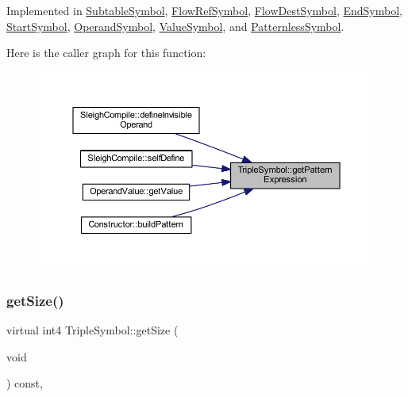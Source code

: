 Implemented in \mbox{\hyperlink{class_subtable_symbol_a103ecc93b2b3fe1a5db3edef893a4d5b}{Subtable\+Symbol}}, \mbox{\hyperlink{class_flow_ref_symbol_a273808a2774690c6c194961c956e3330}{Flow\+Ref\+Symbol}}, \mbox{\hyperlink{class_flow_dest_symbol_ad213382efabd756f4246ac8dd15f5a90}{Flow\+Dest\+Symbol}}, \mbox{\hyperlink{class_end_symbol_a950a96cd8076dd9e98057751d23aa6de}{End\+Symbol}}, \mbox{\hyperlink{class_start_symbol_aeeb32a702943ac0da1178cdf97e7002f}{Start\+Symbol}}, \mbox{\hyperlink{class_operand_symbol_aaebd25df34fa9100b22e3df9272d2910}{Operand\+Symbol}}, \mbox{\hyperlink{class_value_symbol_aa35d8513d3b3cb589d05128fb46f23fc}{Value\+Symbol}}, and \mbox{\hyperlink{class_patternless_symbol_aa0143261780eb2f63e09a6f8f377a888}{Patternless\+Symbol}}.

Here is the caller graph for this function\+:
\nopagebreak
\begin{figure}[H]
\begin{center}
\leavevmode
\includegraphics[width=350pt]{class_triple_symbol_a213895658c5fe547edf9ac54a1d2de2e_icgraph}
\end{center}
\end{figure}
\mbox{\label{class_triple_symbol_a7351de4a1db140381d0b7913a8c613fd}} 
\subsubsection{\texorpdfstring{getSize()}{getSize()}}
{\footnotesize\ttfamily virtual int4 Triple\+Symbol\+::get\+Size (\begin{DoxyParamCaption}\item[{void}]{ }\end{DoxyParamCaption}) const\hspace{0.3cm}{\ttfamily [inline]}, {\ttfamily [virtual]}}



